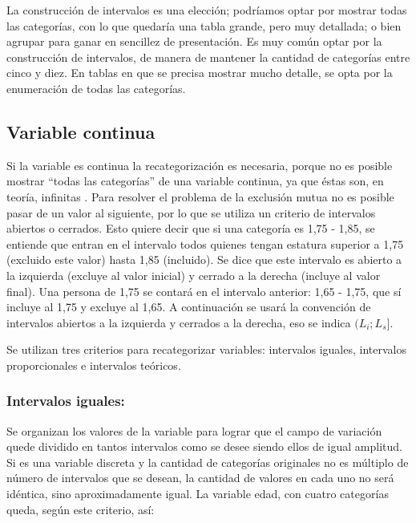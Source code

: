 \documentclass[]{book}
\begin{document}
La construcción de intervalos es una elección; podríamos optar por mostrar todas las categorías, con lo que quedaría una tabla grande, pero muy detallada; o bien agrupar para ganar en sencillez de presentación. Es muy común optar por la construcción de intervalos, de manera de mantener la cantidad de categorías entre cinco y diez. En tablas en que se precisa mostrar mucho detalle, se opta por la enumeración de todas las categorías.

\hypertarget{variable-continua}{%
\subsection{Variable continua}\label{variable-continua}}

Si la variable es continua la recategorización es necesaria, porque no es posible mostrar ``todas las categorías'' de una variable continua, ya que éstas son, en teoría, infinitas . Para resolver el problema de la exclusión mutua no es posible pasar de un valor al siguiente, por lo que se utiliza un criterio de intervalos abiertos o cerrados. Esto quiere decir que si una categoría es 1,75 - 1,85, se entiende que entran en el intervalo todos quienes tengan estatura superior a 1,75 (excluido este valor) hasta 1,85 (incluido). Se dice que este intervalo es abierto a la izquierda (excluye al valor inicial) y cerrado a la derecha (incluye al valor final). Una persona de 1,75 se contará en el intervalo anterior: 1,65 - 1,75, que sí incluye al 1,75 y excluye al 1,65. A continuación se usará la convención de intervalos abiertos a la izquierda y cerrados a la derecha, eso se indica \((L_i; L_s]\).

Se utilizan tres criterios para recategorizar variables: intervalos iguales, intervalos proporcionales e intervalos teóricos.

\hypertarget{intervalos-iguales}{%
\subsubsection{Intervalos iguales:}\label{intervalos-iguales}}

Se organizan los valores de la variable para lograr que el campo de variación quede dividido en tantos intervalos como se desee siendo ellos de igual amplitud. Si es una variable discreta y la cantidad de categorías originales no es múltiplo de número de intervalos que se desean, la cantidad de valores en cada uno no será idéntica, sino aproximadamente igual. La variable edad, con cuatro categorías queda, según este criterio, así:
\end{document}
